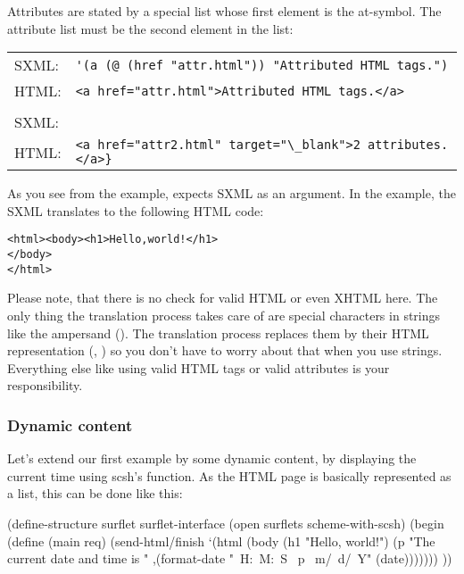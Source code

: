 Attributes are stated by a special list whose first element is the
at-symbol.  The attribute list must be the second element in the list:

\begin{tabular}{ll}
SXML: & \verb|'(a (@ (href "attr.html")) "Attributed HTML tags.")|\\
HTML: & \verb|<a href="attr.html">Attributed HTML tags.</a>|\\
\\
SXML: & \verb|'(a (@ (href "attr2.html") (target "\_blank")) "2
attributes.")}| \\ 
HTML: & \verb|<a href="attr2.html" target="\_blank">2 attributes.</a>}|
\end{tabular}

As you see from the \surflet example,  expects
SXML as an argument.  In the example, the SXML translates to the
following HTML code:
\begin{alltt}
<html><body><h1>Hello, world!</h1>
</body>
</html>
\end{alltt}

Please note, that there is no check for valid HTML or even XHTML
here.  The only thing the translation process takes care of are
special characters in strings like the ampersand (\typew{\&}).  The
translation process replaces them by their HTML representation (\eg,
) so you don't have to worry about that when you use
strings.  Everything else like using valid HTML tags or valid
attributes is your responsibility.


\subsubsection{Dynamic content}

Let's extend our first \surflet example by some dynamic content, \eg
by displaying the current time using scsh's 
function.  As the HTML page is basically represented as a list, this
can be done like this:

\begin{listing}
(define-structure surflet surflet-interface
  (open surflets
        scheme-with-scsh)
  (begin
    (define (main req)
      (send-html/finish
       `(html (body (h1 "Hello, world!")
                    (p "The current date and time is "
                       ,(format-date "~H:~M:~S ~p ~m/~d/~Y" 
                                     (date)))))))
    ))
\end{listing}

